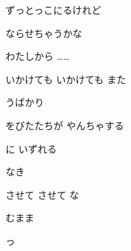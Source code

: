 \documentclass[a4paper,tate,twocolumn,12pt]{ltjtarticle}
\begin{document}
\begin{flushleft}
\begin{minipage}{\linewidth}
ずっとっこにるけれど

ならせちゃうかな

わたしから ……
\end{minipage}

\vspace{2em}

\noindent\begin{minipage}{\linewidth}
いかけても いかけても また

 うばかり

をびたたちが やんちゃする

に いずれる

なき

させて させて な

 むまま

っ
\end{minipage}

\end{flushleft}
\end{document}
